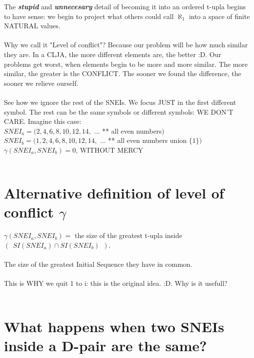 	\noindent
	The \textbf{\textit{stupid}} and \textbf{\textit{unnecesary}} detail of becoming it into an ordered t-upla begins to have sense: we begin to project what others could call $\aleph_{1}$ into a space of finite NATURAL values.
	\\\\
	
	\noindent
	Why we call it "Level of conflict"? Because our problem will be how much similar they are. In a CLJA, the more different elements are, the better :D. Our problems get worst, when elements begin to be more and more similar. The more similar, the greater is the CONFLICT. The sooner we found the difference, the sooner we relieve ourself.
	\\\\
	
	\noindent
	See how we ignore the rest of the SNEIs. We focus JUST in the first different symbol. The rest can be the same symbols or different symbols: WE DON'T CARE. Imagine this case:\\
	$SNEI_{a} = (2,4,6,8,10,12,14,$ ... ** all even numbers$)$\\
	$SNEI_{b} = (1,2,4,6,8,10,12,14,$ ... ** all even numbers union $\{1\})$\\
	$\gamma(SNEI_{a}, SNEI_{b})=0$, WITHOUT MERCY
	\\\\
	
	
	\section {Alternative definition of level of conflict $\gamma$}
	
		\noindent
		$\gamma(SNEI_{a}, SNEI_{b})=$ the size of the greatest t-upla inside $ (\:\: SI(SNEI_{a}) \cap SI(SNEI_{b}) \:\:)$.
		\\\\
		
		\noindent
		The size of the greatest Initial Sequence they have in common.
		\\\\
		
		\noindent
		This is WHY we quit 1 to i: this is the original idea. :D. Why is it usefull?
		\\\\
	\section {What happens when two SNEIs inside a D-pair are the same?}
	
